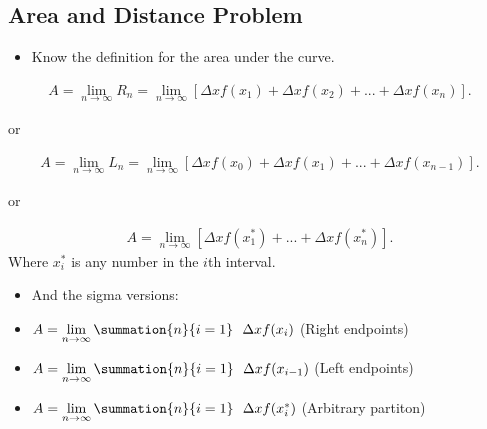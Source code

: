 \documentclass{report}
\begin{document}
    \subsection{Area and Distance Problem}
    \begin{itemize}
      \item Know the definition for the area under the curve. 
    \end{itemize}
         \begin{align*}
       A = \lim_{n \to \infty}{R_{n}} = \lim_{n \to \infty}{[\Delta xf(x_{1}) + \Delta xf(x_{2}) + ... + \Delta xf(x_{n})]}
     .\end{align*}
     \begin{center}
       or
     \end{center}
      \begin{align*}
       A = \lim_{n \to \infty}{L_{n}} = \lim_{n \to \infty}{[\Delta xf(x_{0}) + \Delta xf(x_{1}) + ... + \Delta xf(x_{n-1})]}
     .\end{align*}
     \begin{center}
       or
     \end{center}
     \begin{align*}
       A = \lim_{n \to \infty}{[\Delta xf(x_{1}^{*}) + ... + \Delta xf(x_{n}^{*})]}
     .\end{align*}
     \bigbreak \noindent 
     Where $x_{i}^{*}$ is any number in the $i$th interval.
     \bigbreak \noindent 
     \begin{itemize}
       \item And the sigma versions:
     \end{itemize}
      \begin{itemize}
       \item $A = \lim\limits_{n \to \infty}{\summation{n}{i=1}\ \ \Delta xf(x_{i})} $ (Right endpoints)
       \item $A = \lim\limits_{n \to \infty}{\summation{n}{i=1}\ \ \Delta xf(x_{i-1})} $ (Left endpoints)
       \item $A = \lim\limits_{n \to \infty}{\summation{n}{i=1}\ \ \Delta xf(x_{i}^{*})} $ (Arbitrary partiton)
     \end{itemize}
\end{document}
